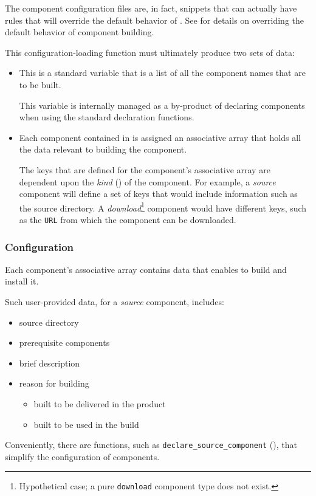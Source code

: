 The component configuration files are, in fact, \makefile snippets
that can actually have rules that will override the default behavior
of \lmsbw.  See  for details on overriding the
default behavior of component building.

This configuration-loading function must ultimately produce two sets
of data:

\begin{itemize}
\item \lmsbwcomponents

  This is a standard \gnumake variable that is a list of all the
  component names that are to be built.

  This variable is internally managed as a by-product of declaring
  components when using the standard declaration functions.

\item {}

  Each component contained in \lmsbwcomponents is assigned an
  associative array that holds all the data relevant to building the
  component.

  The keys that are defined for the component's associative array are
  dependent upon the \emph{kind} () of the
  component.  For example, a \emph{source} component will define a set
  of keys that would include information such as the source directory.
  A \emph{download}\footnote{Hypothetical case; a pure
    \texttt{download} component type does not exist.} component would
  have different keys, such as the \texttt{URL} from which the
  component can be downloaded.
\end{itemize}


\subsubsection{ Configuration}

Each component's associative array contains data that enables \lmsbw
to build and install it.

Such user-provided data, for a \emph{source} component, includes:

\begin{itemize}
\item source directory
\item prerequisite components
\item brief description
\item reason for building
  \begin{itemize}
  \item built to be delivered in the product
  \item built to be used in the build
  \end{itemize}
\end{itemize}

Conveniently, there are \lmsbw functions, such as
\texttt{declare\_source\_component}
(), that simplify the configuration
of components.
